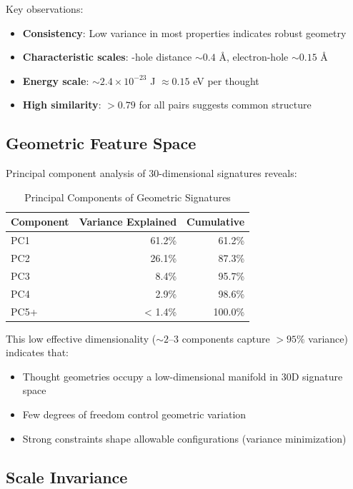 \documentclass[11pt]{article}
\theoremstyle{remark}
\begin{document}
Key observations:
\begin{itemize}
\item \textbf{Consistency}: Low variance in most properties indicates robust geometry
\item \textbf{Characteristic scales}: -hole distance $\sim 0.4$ Å, electron-hole $\sim 0.15$ Å
\item \textbf{Energy scale}: $\sim 2.4 \times 10^{-23}$ J $\approx 0.15$ eV per thought
\item \textbf{High similarity}: $> 0.79$ for all pairs suggests common structure
\end{itemize}

\subsection{Geometric Feature Space}

Principal component analysis of 30-dimensional signatures reveals:

\begin{table}[H]
\centering
\caption{Principal Components of Geometric Signatures}
\begin{tabular}{lrr}
\toprule
\textbf{Component} & \textbf{Variance Explained} & \textbf{Cumulative} \\
\midrule
PC1 & 61.2\% & 61.2\% \\
PC2 & 26.1\% & 87.3\% \\
PC3 & 8.4\% & 95.7\% \\
PC4 & 2.9\% & 98.6\% \\
PC5+ & < 1.4\% & 100.0\% \\
\bottomrule
\end{tabular}
\label{tab:pca}
\end{table}

This low effective dimensionality ($\sim 2$--$3$ components capture $> 95\%$ variance) indicates that:
\begin{itemize}
\item Thought geometries occupy a low-dimensional manifold in 30D signature space
\item Few degrees of freedom control geometric variation
\item Strong constraints shape allowable configurations (variance minimization)
\end{itemize}

\subsection{Scale Invariance}
\end{document}
